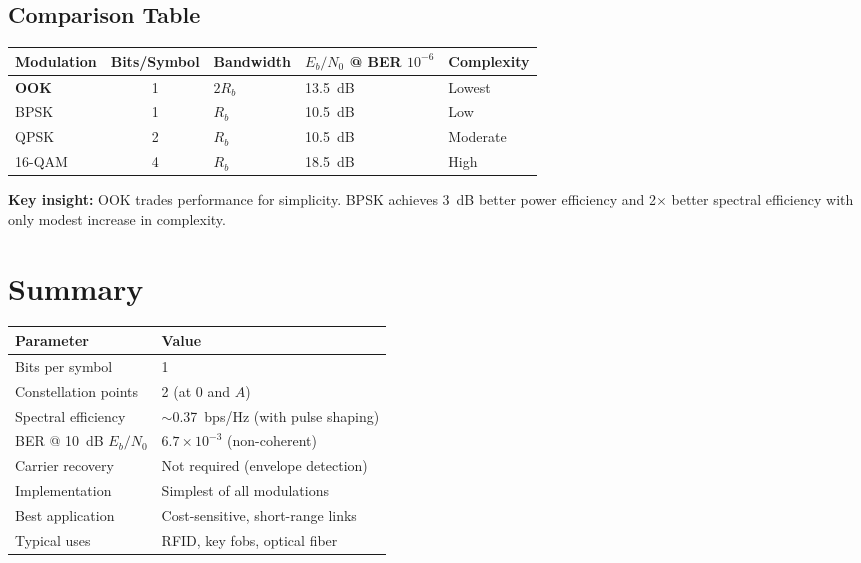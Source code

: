\subsection{Comparison Table}

\begin{center}
\begin{tabularx}{\textwidth}{@{}lcXXl@{}}
\toprule
\textbf{Modulation} & \textbf{Bits/Symbol} & \textbf{Bandwidth} & \textbf{$E_b/N_0$ @ BER $10^{-6}$} & \textbf{Complexity} \\
\midrule
\textbf{OOK} & 1 & $2R_b$ & 13.5~dB & Lowest \\
BPSK & 1 & $R_b$ & 10.5~dB & Low \\
QPSK & 2 & $R_b$ & 10.5~dB & Moderate \\
16-QAM & 4 & $R_b$ & 18.5~dB & High \\
\bottomrule
\end{tabularx}
\end{center}

\textbf{Key insight:} OOK trades performance for simplicity. BPSK achieves 3~dB better power efficiency and 2$\times$ better spectral efficiency with only modest increase in complexity.

\section{Summary}

\begin{center}
\begin{tabular}{@{}ll@{}}
\toprule
\textbf{Parameter} & \textbf{Value} \\
\midrule
Bits per symbol & 1 \\
Constellation points & 2 (at $0$ and $A$) \\
Spectral efficiency & $\sim$0.37~bps/Hz (with pulse shaping) \\
BER @ 10~dB $E_b/N_0$ & $6.7 \times 10^{-3}$ (non-coherent) \\
Carrier recovery & Not required (envelope detection) \\
Implementation & Simplest of all modulations \\
Best application & Cost-sensitive, short-range links \\
Typical uses & RFID, key fobs, optical fiber \\
\bottomrule
\end{tabular}
\end{center}

\vspace{0.5cm}

